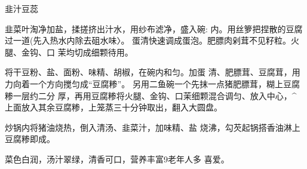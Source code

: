 \begin{recipe}{韭汁豆蕊}

\ingredients


\cooking

\step 	韭菜叶淘净加盐，揉搓挤出汁水，用纱布滤净，盛入碗: 内。用丝箩把捏散的豆腐过一道(先入热水内除去砠水味〉。 蛋清快速调成蛋泡。肥膘肉剁茸不见籽粒。火腿、金钩、口 茉均切成细颗待用。

\step 	将干豆粉、盐、面粉、味精、胡椒，在碗内和匀。加蛋 清、肥膘茸、豆腐茸，用力向着一个方向搅匀成“豆腐糁”。 另用二鱼碗一个先抹一点猪肥膘茸，糊上豆腐糁一层约二分 厚，再用豆腐糁将火腿、金钩、口茉细颗混合调匀、放入中心，^ 上面放入其余豆腐糁，上笼蒸三十分钟取出，翻入大圆盘。

\step 	炒锅内将猪油烧热，倒入清汤、韭菜汁，加味精、盐 烧沸，勾芡起锅搭香油淋上豆腐糁即成。

\notes

菜色白润，汤汁翠绿，清香可口，营养丰富9老年人多 喜爱。

\end{recipe}

